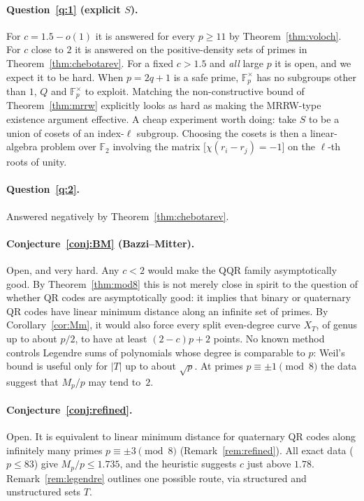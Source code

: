 \documentclass[12pt,letterpaper]{article}
\theoremstyle{definition}
\theoremstyle{remark}
\numberwithin{equation}{section}
\newcommand{\F}{\mathbb{F}}
\newcommand{\Fp}{\mathbb{F}_p}
\begin{document}
\paragraph{Question~\ref{q:1} (explicit $S$).} For $c=1.5-o(1)$ it is answered for
every $p\ge11$ by Theorem~\ref{thm:voloch}. For $c$ close to $2$ it is answered on
the positive-density sets of primes in Theorem~\ref{thm:chebotarev}. For a fixed
$c>1.5$ and \emph{all} large $p$ it is open, and we expect it to be hard. When
$p=2q+1$ is a safe prime, $\Fp^\times$ has no subgroups other than $1$, $Q$ and
$\Fp^\times$ to exploit. Matching the non-constructive bound of
Theorem~\ref{thm:mrrw} explicitly looks as hard as making the MRRW-type existence
argument effective. A cheap experiment worth doing: take $S$ to be a union of cosets
of an index-$\ell$ subgroup. Choosing the cosets is then a linear-algebra problem
over $\F_2$ involving the matrix $\big[\chi(r_i-r_j)=-1\big]$ on the $\ell$-th
roots of unity.

\paragraph{Question~\ref{q:2}.} Answered negatively by
Theorem~\ref{thm:chebotarev}.

\paragraph{Conjecture~\ref{conj:BM} (Bazzi--Mitter).} Open, and very hard. Any
$c<2$ would make the QQR family asymptotically good. By Theorem~\ref{thm:mod8} this
is not merely close in spirit to the question of whether QR codes are asymptotically
good: it implies that binary or quaternary QR codes have linear minimum distance
along an infinite set of primes. By Corollary~\ref{cor:Mm}, it would also force every
split even-degree curve $X_T$, of genus up to about $p/2$, to have at least
$(2-c)p+2$ points. No known method controls Legendre sums of polynomials whose
degree is comparable to $p$: Weil's bound is useful only for $|T|$ up to about
$\sqrt p$. At primes $p\equiv\pm1\pmod8$ the data suggest that $M_p/p$ may tend
to~$2$.

\paragraph{Conjecture~\ref{conj:refined}.} Open. It is equivalent to linear minimum
distance for quaternary QR codes along infinitely many primes $p\equiv\pm3\pmod 8$
(Remark~\ref{rem:refined}). All exact data ($p\le83$) give $M_p/p\le1.735$, and
the heuristic suggests $c$ just above $1.78$. Remark~\ref{rem:legendre} outlines
one possible route, via structured and unstructured sets $T$.
\end{document}
